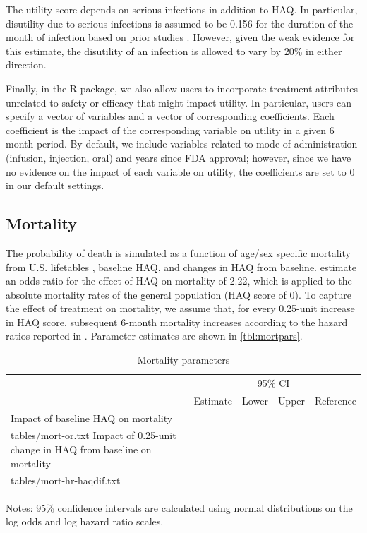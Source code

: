 \documentclass[11pt,final,fleqn]{article}\usepackage[]{graphicx}\usepackage[]{color}
\makeatletter
\theoremstyle{plain}
\newcommand*\ExpandableInput[1]{\@@input#1 }
\newcommand\R{{\textsf{R}}}
\makeatother
\begin{document}
The utility score depends on serious infections in addition to HAQ. In particular, disutility due to serious infections is assumed to be 0.156 for the duration of the month of infection based on prior studies \citep{stevenson2016adalimumab, oppong2013impact}. However, given the weak evidence for this estimate, the disutility of an infection is allowed to vary by 20\% in either direction.

Finally, in the \R{} package, we also allow users to incorporate treatment attributes unrelated to safety or efficacy that might impact utility. In particular, users can specify a vector of variables and a vector of corresponding coefficients. Each coefficient is the impact of the corresponding variable on utility in a given 6 month period. By default, we include variables related to mode of administration (infusion, injection, oral) and years since FDA approval; however, since we have no evidence on the impact of each variable on utility, the coefficients are set to 0 in our default settings.  

\subsection{Mortality}
The probability of death is simulated as a function of age/sex specific mortality from U.S. lifetables \citep{arias2015united}, baseline HAQ, and changes in HAQ from baseline. \citet{wolfe2003predicting} estimate an odds ratio for the effect of HAQ on mortality of 2.22, which is applied to the absolute mortality rates of the general population (HAQ score of 0). To capture the effect of treatment on mortality, we assume that, for every 0.25-unit increase in HAQ score, subsequent 6-month mortality increases according to the hazard ratios reported in \citet{michaud2012mortality}. Parameter estimates are shown in \autoref{tbl:mortpars}.



\begin{table}[!ht]
\begin{center}
\begin{threeparttable}
\caption{Mortality parameters} \label{tbl:mortpars}
\footnotesize
\begin{tabularx}{\textwidth}{@{\extracolsep{\fill}}lcccc}
\hline
\multicolumn{2}{l}{} & \multicolumn{2}{c}{95\% CI} & \multicolumn{1}{l}{} \\
\cmidrule{3-4} 
\multicolumn{1}{l}{} & \multicolumn{1}{l}{Estimate} & \multicolumn{1}{c}{Lower} & \multicolumn{1}{c}{Upper} & \multicolumn{1}{c}{Reference} \\
\hline
Impact of baseline HAQ on mortality \\
\ExpandableInput{tables/mort-or.txt}
Impact of 0.25-unit change in HAQ from baseline on mortality\\
\ExpandableInput{tables/mort-hr-haqdif.txt}
\hline
\end{tabularx}
\scriptsize
Notes: 95\% confidence intervals are calculated using normal distributions on the log odds
and log hazard ratio scales. 
\end{threeparttable}
\end{center}
\end{table}
\end{document}
